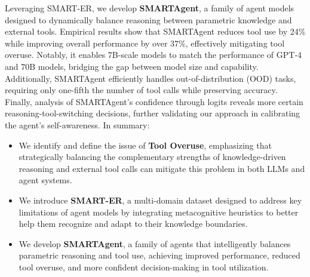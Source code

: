 Leveraging SMART-ER, we develop \textbf{SMARTAgent}, a family of agent models designed to dynamically balance reasoning between parametric knowledge and external tools. Empirical results show that SMARTAgent reduces tool use by 24\% while improving overall performance by over 37\%, effectively mitigating tool overuse. Notably, it enables 7B-scale models to match the performance of GPT-4 and 70B models, bridging the gap between model size and capability. Additionally, SMARTAgent efficiently handles out-of-distribution (OOD) tasks, requiring only one-fifth the number of tool calls while preserving accuracy. Finally, analysis of SMARTAgent’s confidence through logits reveals more certain reasoning-tool-switching decisions, further validating our approach in calibrating the agent’s self-awareness. In summary:
\begin{itemize}[topsep=2pt, partopsep=-5pt, leftmargin=8pt, itemsep=-4.5pt]
\item We identify and define the issue of \textbf{Tool Overuse}, emphasizing that strategically balancing the complementary strengths of knowledge-driven reasoning and external tool calls can mitigate this problem in both LLMs and agent systems.
\item We introduce \textbf{SMART-ER}, a multi-domain dataset designed to address key limitations of agent models by integrating metacognitive heuristics to better help them recognize and adapt to their knowledge boundaries.
\item We develop \textbf{SMARTAgent}, a family of agents that intelligently balances parametric reasoning and tool use, achieving improved performance, reduced tool overuse, and more confident decision-making in tool utilization.
\end{itemize}
